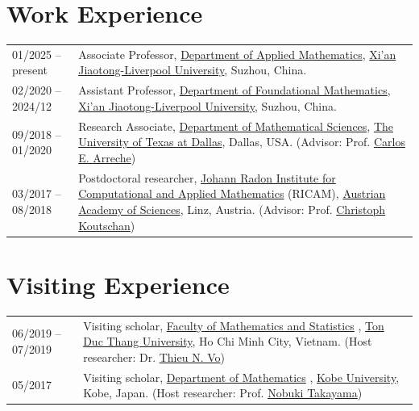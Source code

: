 \documentclass[a4paper,12pt]{article}
\begin{document}
\section*{\Large{Work Experience}}
\begin{tabular}{@{}p{1.4in}p{4.5in}}
01/2025 --  present            & Associate Professor, \href{https://www.xjtlu.edu.cn/en/study/departments/school-of-mathematics-and-physics/applied-mathematics}{Department of Applied Mathematics}, \href{https://www.xjtlu.edu.cn/en/}{Xi'an Jiaotong-Liverpool University}, Suzhou, China. \\
02/2020 --  2024/12             & Assistant Professor, \href{https://www.xjtlu.edu.cn/en/study/departments/academic-departments/foundational-mathematics/}{Department of Foundational Mathematics}, \href{https://www.xjtlu.edu.cn/en/}{Xi'an Jiaotong-Liverpool University}, Suzhou, China. \\
09/2018 -- 01/2020    & Research Associate, \href{https://www.utdallas.edu/math/}{Department of Mathematical Sciences}, 
                        \href{https://www.utdallas.edu/}{The University of Texas at Dallas}, Dallas, USA. 
                        (Advisor: Prof. \href{https://www.utdallas.edu/~arreche/}{Carlos E. Arreche}) \\    
03/2017 -- 08/2018    & Postdoctoral researcher, 
                        \href{https://www.ricam.oeaw.ac.at/}{Johann Radon Institute for Computational and Applied Mathematics} (RICAM),
                        \href{http://www.oeaw.ac.at/en/austrian-academy-of-sciences/}{Austrian Academy of Sciences}, Linz, Austria. 
                        (Advisor: Prof. \href{http://www.koutschan.de/}{Christoph Koutschan})\\
\end{tabular}

\section*{\Large{Visiting Experience}}
\begin{tabular}{@{}p{1.4in}p{4.5in}}
06/2019 -- 07/2019               & Visiting scholar, 
                        \href{https://fms.tdtu.edu.vn/}{Faculty of Mathematics and Statistics} ,
                        \href{https://tdtu.edu.vn/}{Ton Duc Thang University}, Ho Chi Minh City, Vietnam. 
                        (Host researcher: Dr. \href{https://sites.google.com/tdtu.edu.vn/vongocthieu}{Thieu N. Vo})\\
05/2017               & Visiting scholar, 
                        \href{http://www.math.kobe-u.ac.jp/}{Department of Mathematics} ,
                        \href{http://www.kobe-u.ac.jp/en/}{Kobe University}, Kobe, Japan. 
                        (Host researcher: Prof. \href{http://www.math.kobe-u.ac.jp/home-j/takayama-e.html}{Nobuki Takayama})\\
\end{tabular}
\end{document}
